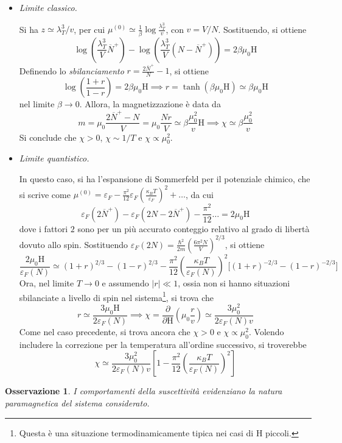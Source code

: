 \documentclass[11pt, a4paper]{scrartcl}
\theoremstyle{style}
\newtheorem{osservazione}{Osservazione}[section]
\theoremstyle{style1}
\numberwithin{equation}{subsection}
\begin{document}
\begin{itemize}
	\item \textit{Limite classico.} 

		Si ha $z\simeq \lambda _T^3 / v$, per cui $\mu ^{(0)} \simeq \frac{1}{\beta }\log \frac{\lambda _T^3}{v}$, con $v = V / N$.
		Sostituendo, si ottiene 
		\[
		\log \left(\frac{\lambda _T^3}{V}\overline{N}^+\right)  - \log \left(\frac{\lambda _T^3}{V}\left(N-\overline{N}^+\right) \right) = 2 \beta \mu _0 \mathrm{H} 
		\] 
	Definendo lo \textit{sbilanciamento} $r = \frac{2 \overline{N}^+}{N}-1$, si ottiene
	\[
	\log \left(\frac{1+r}{1-r}\right) = 2 \beta \mu _0 \mathrm{H} \implies r = \tanh \left(\beta \mu _0 \mathrm{H} \right) \simeq \beta \mu _0 \mathrm{H} 
	\] 
nel limite $\beta \to 0$.
Allora, la magnetizzazione \`e data da 
\[
m = \mu _0 \frac{2\overline{N}^+ - N}{V} = \mu _0 \frac{Nr}{V}\simeq \beta  \frac{\mu _0^2}{v} \mathrm{H} \implies \chi  \simeq \beta  \frac{\mu _0^2}{v}
\] 
Si conclude che $\chi > 0 $, $\chi \sim 1 / T$ e $\chi \propto \mu _0^2$.
\item \textit{Limite quantistico.} 

	In questo caso, si ha l'espansione di Sommerfeld per il potenziale chimico, che si scrive come $\mu ^{(0)} = \varepsilon _F - \frac{\pi^2}{12}\varepsilon _F \left(\frac{\kappa _B T}{\varepsilon _F}\right) ^2 + \ldots$, da cui
	\[
	\varepsilon _F (2\overline{N}^+) - \varepsilon _F(2N-2\overline{N}^+) - \frac{\pi^2}{12}\ldots = 2\mu _0 \mathrm{H} 
	\] 
dove i fattori $2$ sono per un pi\`u accurato conteggio relativo al grado di libert\`a dovuto allo spin.	
Sostituendo $\varepsilon _F(2N) = \frac{\hbar ^2}{2m}\left(\frac{6 \pi^2 N}{V}\right) ^{2 / 3}$, si ottiene
\[
	\frac{2\mu _0 \mathrm{H} }{\varepsilon _F(N)}\simeq (1+r)^{2 / 3} - (1-r)^{2 / 3} - \frac{\pi^2}{12} \left(\frac{\kappa _B T}{\varepsilon _F(N)}\right) ^2 \big[(1+r)^{-2 / 3} - (1-r)^{- 2 /3}\big]
\] 
Ora, nel limite $T\to 0$ e assumendo $\lvert r \rvert \ll 1$, ossia non si hanno situazioni sbilanciate a livello di spin nel sistema\footnote{Questa \`e una situazione termodinamicamente tipica nei casi di $\mathrm{H} $ piccoli.}, si trova che 
\[
r \simeq \frac{3 \mu _0 \mathrm{H} }{2 \varepsilon _F(N)} \implies \chi = \frac{\partial }{\partial \mathrm{H} } \left(\mu _0 \frac{r}{v}\right)  \simeq \frac{3\mu _0^2}{2\varepsilon _F(N) v}
\] 
Come nel caso precedente, si trova ancora che $\chi >0$ e $\chi \propto \mu _0^2$.
Volendo includere la correzione per la temperatura all'ordine successivo, si troverebbe
\[
\chi \simeq \frac{3\mu _0^2}{2 \varepsilon _F(N)v} \left[ 1 - \frac{\pi^2}{12}\left(\frac{\kappa _B T}{\varepsilon _F(N)}\right) ^2 \right] 
\] 
\end{itemize}
\begin{osservazione}
I comportamenti della suscettivit\`a evidenziano la natura paramagnetica del sistema considerato.
\end{osservazione}
\end{document}
